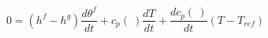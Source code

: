 \begin{equation}
0= (h^f-h^g) \frac{d\theta^f }{dt} + c_p(\ ) \frac{d T}{dt} + \frac{d c_p(\ )}{dt} (T- T_{ref})
\end{equation}